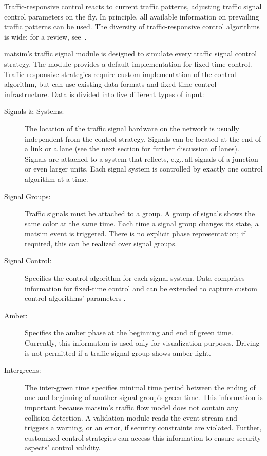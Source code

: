 Traffic-responsive control reacts to current traffic patterns, adjusting traffic signal control parameters on the fly. 
In principle, all available information on prevailing traffic patterns can be used. 
The diversity of traffic-responsive control algorithms is wide; for a review, see~\citet[][]{Grether2014PhD}. 

\gls{matsim}'s traffic signal module is designed to simulate every traffic signal control strategy. 
The module provides a default implementation for fixed-time control. 
Traffic-responsive strategies require custom implementation of the control algorithm, but can use existing data formats and fixed-time control infrastructure. 
Data is divided into five different types of input:
%
\begin{description}
	\item[Signals \& Systems:] The location of the traffic signal hardware on the network is usually independent from the control strategy. 
		Signals can be located at the end of a link or a lane (see the next section for further discussion of lanes). Signals are attached to a system that reflects, e.g.,\,all signals of a junction or even larger units. 
		Each signal system is controlled by exactly one control algorithm at a time.  
	\item[Signal Groups:] Traffic signals must be attached to a group. 
		A group of signals shows the same color at the same time. 
		Each time a signal group changes its state, a \gls{matsim} event is triggered. 
		There is no explicit phase representation; 
		if required, this can be realized over signal groups.  
	\item[Signal Control:] Specifies the control algorithm for each signal system. 
		Data comprises information for fixed-time control and can be extended to capture custom control algorithms' parameters . 
	\item[Amber:] Specifies the amber phase at the beginning and end of green time. 
		Currently, this information is used only for visualization purposes. 
		Driving is not permitted if a traffic signal group shows amber light. 
	\item[Intergreens:] The inter-green time specifies minimal time period between the ending of one and beginning of another signal group's green time.  
		This information is important because \gls{matsim}'s traffic flow model does not contain any collision detection. 
		A validation module reads the event stream and triggers a warning, or an error, if security constraints are violated. 
		Further, customized control strategies can access this information to ensure security aspects' control validity.    
\end{description}

